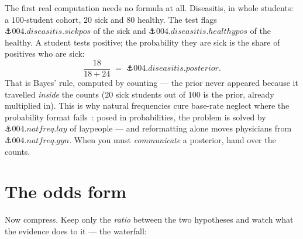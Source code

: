 \begin{narrative}
The first real computation needs no formula at all. Diseasitis, in
whole students: a $100$-student cohort, $20$ sick and $80$ healthy.
The test flags $\anchor{004.diseasitis.sickpos}$ of the sick and
$\anchor{004.diseasitis.healthypos}$ of the healthy. A student tests
positive; the probability they are sick is the share of positives who
are sick:
\[
  \frac{18}{18 + 24} \;=\; \anchor{004.diseasitis.posterior} .
\]
That is Bayes' rule, computed by counting — the prior never appeared
because it travelled \emph{inside} the counts ($20$ sick students out
of $100$ is the prior, already multiplied in). This is why natural
frequencies cure base-rate neglect where the probability format
fails~\cite{probability-gigerenzer-hoffrage-1995-how-to-improve-bayesian-reasoning-w}:
posed in probabilities, the problem is solved by
$\anchor{004.natfreq.lay}$ of laypeople — and reformatting alone moves
physicians from $\anchor{004.natfreq.gyn}$. When you must
\emph{communicate} a posterior, hand over the counts.

\section{The odds form}

Now compress. Keep only the \emph{ratio} between the two hypotheses
and watch what the evidence does to it — the waterfall:

\begin{center}
\end{center}


\end{narrative}

